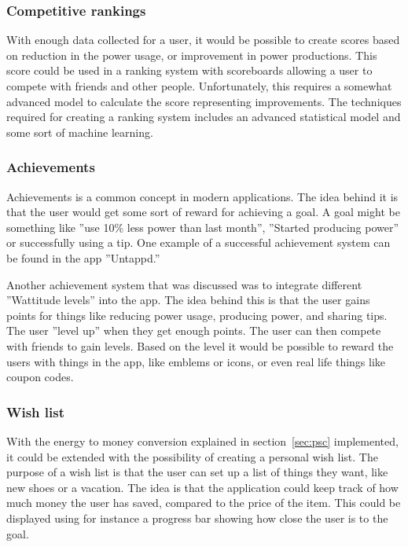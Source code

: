 \subsubsection{Competitive rankings}
With enough data collected for a user, it would be possible to create scores based on reduction in the power usage, or improvement in power productions. This score could be used in a ranking system with scoreboards allowing a user to compete with friends and other people. Unfortunately, this requires a somewhat advanced model to calculate the score representing improvements. The techniques required for creating a ranking system includes an advanced statistical model and some sort of machine learning. 

\subsubsection{Achievements}
Achievements is a common concept in modern applications. The idea behind it is that the user would get some sort of reward for achieving a goal. A goal might be something like ''use 10\% less power than last month'', ''Started producing power'' or successfully using a tip.
One example of a successful achievement system can be found in the app ''Untappd.''~\cite{untappd}

Another achievement system that was discussed was to integrate different ''Wattitude levels'' into the app. The idea behind this is that the user gains points for things like reducing power usage, producing power, and sharing tips. The user ''level up'' when they get enough points. The user can then compete with friends to gain levels. Based on the level it would be possible to reward the users with things in the app, like emblems or icons, or even real life things like coupon codes.

\subsubsection{Wish list}
With the energy to money conversion explained in section~\ref{sec:psc} implemented, it could be extended with the possibility of creating a personal wish list. 
The purpose of a wish list is that the user can set up a list of things they want, like new shoes or a vacation. The idea is that the application could keep track of how much money the user has saved, compared to the price of the item. This could be displayed using for instance a progress bar showing how close the user is to the goal.
